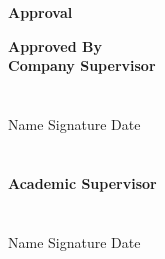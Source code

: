 \thispagestyle{empty}


\vspace*{1cm}

\begin{center}
    \textbf{Approval}
\end{center}

\noindent
\textbf{Approved By}
\vspace*{0.7cm} \\
\textbf{Company Supervisor}
\vspace*{1cm} \\ \\
\hspace*{-0.5cm}%
\dotfill\\
Name \hspace{5cm} Signature \hspace{3cm} Date\\\\\\
\textbf{Academic Supervisor}
\vspace*{1cm} \\ \\
\hspace*{-0.5cm}%
\dotfill\\
Name \hspace{5cm} Signature \hspace{3cm} Date\\\\
\hspace*{8.5cm}%

\noindent 
